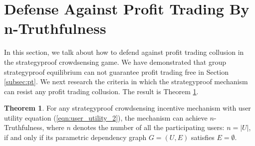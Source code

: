 \documentclass[conference]{IEEEtran}
\theoremstyle{definition}
\newtheorem{theorem}{Theorem}
\begin{document}
\section{Defense Against Profit Trading By n-Truthfulness}
\label{sec:DFPT}
In this section, we talk about how to defend against profit trading collusion in the strategyproof crowdsensing game. We have demonstrated that group strategyproof equilibrium can not guarantee profit trading free in Section \ref{subsec:pt}. We next research the criteria in which the strategyproof mechanism can resist any profit trading collusion. The result is Theorem \ref{thm:pt}.
\begin{theorem}
\label{thm:pt}
For any strategyproof crowdsensing incentive mechanism with user utility equation (\ref{eqn:user_utility_2}), the mechanism can achieve $n$-Truthfulness, where $n$ denotes the number of all the participating users: $n=|U|$, if and only if its parametric dependency graph $G=(U,E)$ satisfies $E=\emptyset$.
\end{theorem}
\end{document}
